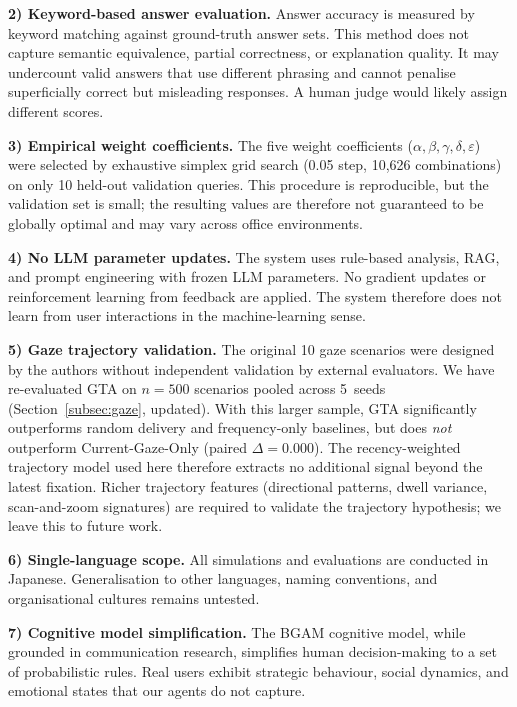 \documentclass[journal]{IEEEtran}
\begin{document}
\textbf{2) Keyword-based answer evaluation.}
Answer accuracy is measured by keyword matching against ground-truth answer sets. This method does not capture semantic equivalence, partial correctness, or explanation quality. It may undercount valid answers that use different phrasing and cannot penalise superficially correct but misleading responses. A human judge would likely assign different scores.

\textbf{3) Empirical weight coefficients.}
The five weight coefficients ($\alpha, \beta, \gamma, \delta, \varepsilon$) were selected by exhaustive simplex grid search (0.05 step, 10{,}626 combinations) on only 10 held-out validation queries. This procedure is reproducible, but the validation set is small; the resulting values are therefore not guaranteed to be globally optimal and may vary across office environments.

\textbf{4) No LLM parameter updates.}
The system uses rule-based analysis, RAG, and prompt engineering with frozen LLM parameters. No gradient updates or reinforcement learning from feedback are applied. The system therefore does not learn from user interactions in the machine-learning sense.

\textbf{5) Gaze trajectory validation.}
The original 10 gaze scenarios were designed by the authors without independent validation by external evaluators. We have re-evaluated GTA on $n{=}500$ scenarios pooled across 5~seeds (Section~\ref{subsec:gaze}, updated). With this larger sample, GTA significantly outperforms random delivery and frequency-only baselines, but does \emph{not} outperform Current-Gaze-Only (paired $\Delta = 0.000$). The recency-weighted trajectory model used here therefore extracts no additional signal beyond the latest fixation. Richer trajectory features (directional patterns, dwell variance, scan-and-zoom signatures) are required to validate the trajectory hypothesis; we leave this to future work.

\textbf{6) Single-language scope.}
All simulations and evaluations are conducted in Japanese. Generalisation to other languages, naming conventions, and organisational cultures remains untested.

\textbf{7) Cognitive model simplification.}
The BGAM cognitive model, while grounded in communication research, simplifies human decision-making to a set of probabilistic rules. Real users exhibit strategic behaviour, social dynamics, and emotional states that our agents do not capture.
\end{document}
